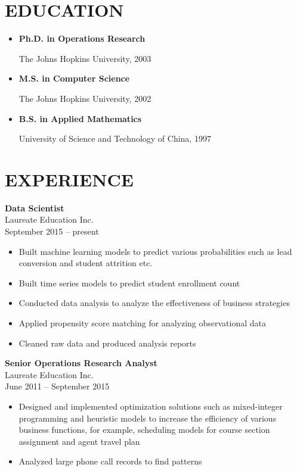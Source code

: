 \documentclass[11pt]{res} %
\begin{document}
\begin{resume}
                                               
 
\section{EDUCATION} 
\begin{itemize} \itemsep -2pt
	\item {\bf Ph.D. in Operations Research}

	The Johns Hopkins University, 2003
	\item {\bf M.S. in Computer Science}

	The Johns Hopkins University, 2002
	\item {\bf B.S. in Applied Mathematics}

	University of Science and Technology of China, 1997
\end{itemize}

 
\section{EXPERIENCE} 
{\bf Data Scientist} \\
Laureate Education Inc.\\
September 2015 -- present 
\vspace{0.05in}
   \begin{itemize} \itemsep -2pt  %
   \item Built machine learning models to predict various probabilities such as lead conversion and student attrition etc.
	 \item Built time series models to predict student enrollment count
	 \item Conducted  data analysis to analyze the effectiveness of business strategies
	 \item Applied propensity score matching for analyzing observational data
	 \item Cleaned raw data and produced analysis reports
\end{itemize}
{\bf Senior Operations Research Analyst}\\
Laureate Education Inc. \\
June 2011 -- September 2015
\vspace{0.05in}
\begin{itemize} \itemsep -2pt
	 \item Designed and implemented optimization solutions such as mixed-integer programming and heuristic models to increase the efficiency of various business functions, for example, scheduling models for course section assignment and agent travel plan
	 \item Analyzed large phone call records to find patterns
 \end{itemize}


\end{resume}
\end{document}
